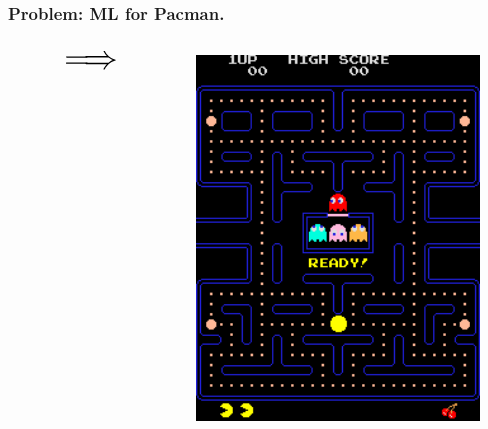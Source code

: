 \begin{frame}
  \frametitle{Problem: ML for Pacman.}
  \begin{columns}
    \begin{column}{0.5\textwidth}
    \begin{equation*}
    \ugearrow
    \end{equation*}
    \end{column}
    \begin{column}{0.5\textwidth}
    \includegraphics[width=0.9\textwidth]{Pac-man.png}
    \end{column}
  \end{columns}
\end{frame}




